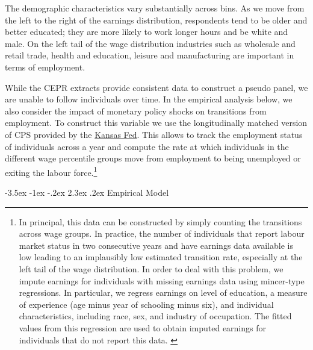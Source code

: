 \documentclass[a4paper,12pt]{article}%
\makeatletter
\renewcommand\subsection{\@startsection {subsection}{2}{\z@}%
                  {-3.5ex \@plus -1ex \@minus -.2ex}%
                  {2.3ex \@plus.2ex}%
                  {\centering\normalsize\scshape\color{black}}}
\makeatother
\begin{document}
The demographic characteristics vary substantially across bins. As we move from the left to the right of the earnings distribution, respondents tend to be older and better educated; they are more likely to work longer hours and be white and male. On the left tail of the wage distribution industries such as wholesale and retail trade, health and education, leisure and manufacturing are important in terms of employment.

While the CEPR extracts provide consistent data to construct a pseudo panel, we are unable to follow individuals over time. In the empirical analysis below, we also consider the impact of monetary policy shocks on transitions from employment. To construct this variable we use the longitudinally matched version of CPS provided by the \href{https://cps.kansascityfed.org/}{Kansas Fed}. This allows to track the employment status of individuals across a year and compute the rate at which individuals in the different wage percentile groups move from employment to being unemployed or exiting the labour force.\footnote{In principal, this data can be constructed by simply counting the transitions across wage groups. In practice, the number of individuals that report labour market status in two consecutive years and have earnings data available is low leading to an implausibly low estimated transition rate, especially at the left tail of the wage distribution. In order to deal with this problem, we impute earnings for individuals with missing earnings data using  mincer-type regressions. In particular, we regress earnings on level of education, a measure of experience (age minus year of schooling minus six), and individual characteristics, including race, sex, and industry of occupation. The fitted values from this regression are used to obtain imputed earnings for individuals that do not report this data. \label{foot:empl}}  



\subsection{Empirical Model}\label{T:Empirics:EM}
\end{document}
